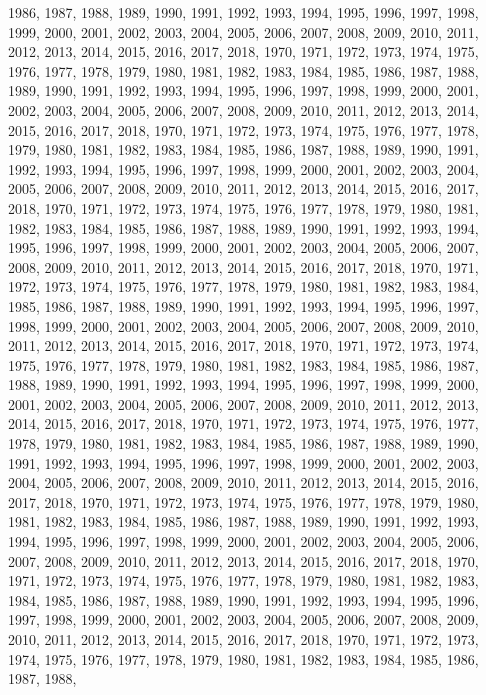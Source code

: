 \documentclass[
]{article}
\begin{document}
1986, 1987, 1988, 1989, 1990, 1991, 1992, 1993, 1994, 1995, 1996, 1997,
1998, 1999, 2000, 2001, 2002, 2003, 2004, 2005, 2006, 2007, 2008, 2009,
2010, 2011, 2012, 2013, 2014, 2015, 2016, 2017, 2018, 1970, 1971, 1972,
1973, 1974, 1975, 1976, 1977, 1978, 1979, 1980, 1981, 1982, 1983, 1984,
1985, 1986, 1987, 1988, 1989, 1990, 1991, 1992, 1993, 1994, 1995, 1996,
1997, 1998, 1999, 2000, 2001, 2002, 2003, 2004, 2005, 2006, 2007, 2008,
2009, 2010, 2011, 2012, 2013, 2014, 2015, 2016, 2017, 2018, 1970, 1971,
1972, 1973, 1974, 1975, 1976, 1977, 1978, 1979, 1980, 1981, 1982, 1983,
1984, 1985, 1986, 1987, 1988, 1989, 1990, 1991, 1992, 1993, 1994, 1995,
1996, 1997, 1998, 1999, 2000, 2001, 2002, 2003, 2004, 2005, 2006, 2007,
2008, 2009, 2010, 2011, 2012, 2013, 2014, 2015, 2016, 2017, 2018, 1970,
1971, 1972, 1973, 1974, 1975, 1976, 1977, 1978, 1979, 1980, 1981, 1982,
1983, 1984, 1985, 1986, 1987, 1988, 1989, 1990, 1991, 1992, 1993, 1994,
1995, 1996, 1997, 1998, 1999, 2000, 2001, 2002, 2003, 2004, 2005, 2006,
2007, 2008, 2009, 2010, 2011, 2012, 2013, 2014, 2015, 2016, 2017, 2018,
1970, 1971, 1972, 1973, 1974, 1975, 1976, 1977, 1978, 1979, 1980, 1981,
1982, 1983, 1984, 1985, 1986, 1987, 1988, 1989, 1990, 1991, 1992, 1993,
1994, 1995, 1996, 1997, 1998, 1999, 2000, 2001, 2002, 2003, 2004, 2005,
2006, 2007, 2008, 2009, 2010, 2011, 2012, 2013, 2014, 2015, 2016, 2017,
2018, 1970, 1971, 1972, 1973, 1974, 1975, 1976, 1977, 1978, 1979, 1980,
1981, 1982, 1983, 1984, 1985, 1986, 1987, 1988, 1989, 1990, 1991, 1992,
1993, 1994, 1995, 1996, 1997, 1998, 1999, 2000, 2001, 2002, 2003, 2004,
2005, 2006, 2007, 2008, 2009, 2010, 2011, 2012, 2013, 2014, 2015, 2016,
2017, 2018, 1970, 1971, 1972, 1973, 1974, 1975, 1976, 1977, 1978, 1979,
1980, 1981, 1982, 1983, 1984, 1985, 1986, 1987, 1988, 1989, 1990, 1991,
1992, 1993, 1994, 1995, 1996, 1997, 1998, 1999, 2000, 2001, 2002, 2003,
2004, 2005, 2006, 2007, 2008, 2009, 2010, 2011, 2012, 2013, 2014, 2015,
2016, 2017, 2018, 1970, 1971, 1972, 1973, 1974, 1975, 1976, 1977, 1978,
1979, 1980, 1981, 1982, 1983, 1984, 1985, 1986, 1987, 1988, 1989, 1990,
1991, 1992, 1993, 1994, 1995, 1996, 1997, 1998, 1999, 2000, 2001, 2002,
2003, 2004, 2005, 2006, 2007, 2008, 2009, 2010, 2011, 2012, 2013, 2014,
2015, 2016, 2017, 2018, 1970, 1971, 1972, 1973, 1974, 1975, 1976, 1977,
1978, 1979, 1980, 1981, 1982, 1983, 1984, 1985, 1986, 1987, 1988, 1989,
1990, 1991, 1992, 1993, 1994, 1995, 1996, 1997, 1998, 1999, 2000, 2001,
2002, 2003, 2004, 2005, 2006, 2007, 2008, 2009, 2010, 2011, 2012, 2013,
2014, 2015, 2016, 2017, 2018, 1970, 1971, 1972, 1973, 1974, 1975, 1976,
1977, 1978, 1979, 1980, 1981, 1982, 1983, 1984, 1985, 1986, 1987, 1988,
\end{document}
